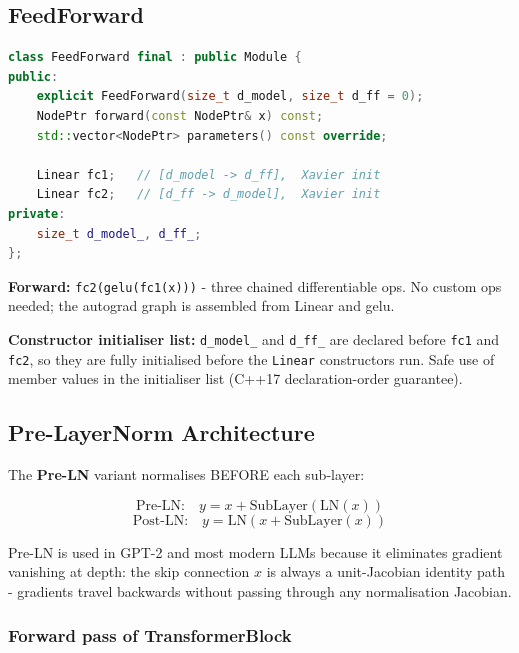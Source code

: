 \documentclass[12pt, a4paper]{article}
\begin{document}
\subsection{FeedForward}

\begin{tcolorbox}[codebox, title={\texttt{nn/feedforward.hpp} / \texttt{.cpp}}]
\begin{lstlisting}[language=C++]
class FeedForward final : public Module {
public:
    explicit FeedForward(size_t d_model, size_t d_ff = 0);
    NodePtr forward(const NodePtr& x) const;
    std::vector<NodePtr> parameters() const override;

    Linear fc1;   // [d_model -> d_ff],  Xavier init
    Linear fc2;   // [d_ff -> d_model],  Xavier init
private:
    size_t d_model_, d_ff_;
};
\end{lstlisting}
\textbf{Forward:}  \lstinline{fc2(gelu(fc1(x)))} - three chained differentiable ops.
No custom ops needed; the autograd graph is assembled from Linear and gelu.

\textbf{Constructor initialiser list:}  \lstinline{d_model_} and \lstinline{d_ff_}
are declared before \lstinline{fc1} and \lstinline{fc2}, so they are fully initialised
before the \lstinline{Linear} constructors run.  Safe use of member values in
the initialiser list (C++17 declaration-order guarantee).
\end{tcolorbox}

\subsection{Pre-LayerNorm Architecture}

The \textbf{Pre-LN} variant normalises BEFORE each sub-layer:

\[
  \text{Pre-LN:} \quad y = x + \text{SubLayer}(\text{LN}(x))
\]
\[
  \text{Post-LN:} \quad y = \text{LN}(x + \text{SubLayer}(x))
\]

Pre-LN is used in GPT-2 and most modern LLMs because it eliminates gradient
vanishing at depth: the skip connection \(x\) is always a unit-Jacobian identity
path - gradients travel backwards without passing through any normalisation
Jacobian.

\subsubsection{Forward pass of TransformerBlock}
\end{document}
